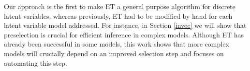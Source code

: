 





Our approach is the first to make ET a general purpose algorithm for discrete latent variables,%
 whereas previously, ET had to be modified by hand for each latent variable model addressed. 
For instance, in Section \ref{invec} we will show that preselection is crucial for efficient inference in complex models. 
Although ET has already been successful in some models, this work shows that more complex models will crucially depend on an improved selection step and focuses on automating this step.

